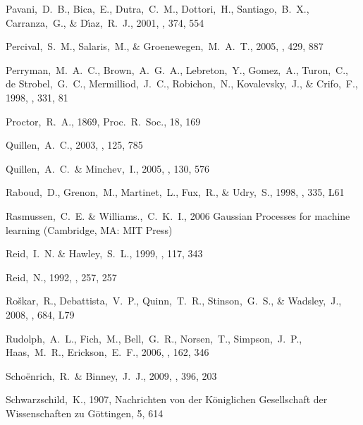 \begin{thebibliography}{99}
  Pavani,~D.~B., Bica,~E., Dutra,~C.~M., Dottori,~H., Santiago,~B.~X., Carranza,~G., \& D{\'{\i}}az,~R.~J., 2001,
  \aap, 374, 554

  Percival,~S.~M., Salaris,~M., \& Groenewegen,~M.~A.~T., 2005,
  \aap, 429, 887

  Perryman,~M.~A.~C., Brown,~A.~G.~A., Lebreton,~Y., Gomez,~A., Turon,~C., de Strobel,~G.~C., Mermilliod,~J.~C., Robichon,~N., Kovalevsky,~J., \& Crifo,~F., 1998,
  \aap, 331, 81

  Proctor,~R.~A., 1869, Proc.~R.~Soc., 18, 169

  Quillen,~A.~C., 2003, 
  \aj, 125, 785

  Quillen,~A.~C.~\& Minchev,~I., 2005,
  \aj, 130, 576

  Raboud,~D., Grenon,~M., Martinet,~L., Fux,~R., \& Udry,~S., 1998,
  \aap, 335, L61

  Rasmussen,~C.~E. \& Williams.,~C.~K.~I., 2006
  Gaussian Processes for machine learning (Cambridge, MA: MIT Press)

  Reid,~I.~N. \& Hawley,~S.~L., 1999,
  \aj, 117, 343

  Reid,~N., 1992,
  \mnras, 257, 257

  Ro{\v s}kar,~R., Debattista,~V.~P., Quinn,~T.~R., Stinson,~G.~S., \& Wadsley,~J., 2008,
  \apjl, 684, L79

  Rudolph,~A.~L., Fich,~M., Bell,~G.~R., Norsen,~T., Simpson,~J.~P., Haas,~M.~R., Erickson,~E.~F., 2006,
  \apjs, 162, 346

  Scho\"{e}nrich,~R.~\& Binney,~J.~J., 2009,
  \mnras, 396, 203

  Schwarzschild,~K., 1907, Nachrichten von der
  K\"{o}niglichen Gesellschaft der Wissenschaften zu G\"{o}ttingen, 5,
  614


\end{thebibliography}
